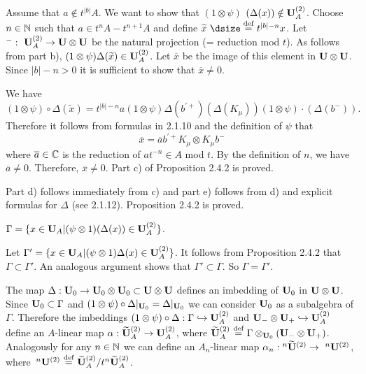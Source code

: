  Assume that  $a \notin t^{|b|}A$.  We want to show that
$(1 \otimes \psi)$ $(\Delta(x)) \notin {\bold U}_A^{(2)}$.  Choose $n \in {\Bbb
N}$  such
that $a \in t {}^nA - t {}^{n+1}A$  and  define  $\widetilde{x}\
{\dsize\buildrel{\text{def}}\over =}\ t^{|b|-n}x$.  Let
${}^-:\ {\bold U}_A^{(2)} \to {\bold U} \otimes {\bold U}$  be  the natural
projection
(= reduction mod $t$).  As follows from part b), $(1 \otimes \psi)
\Delta(\widetilde{x}) \in {\bold U}_A^{(2)}$.  Let $\overline{x}$ be the
image of this element in  ${\bold U} \otimes {\bold U}$.
Since $|b| - n > 0$  it is sufficient to show that
$\overline{x} \ne 0$.

We have
$$
(1 \otimes \psi) \circ \Delta(\widetilde{x}) = t^{|b|-n} a (1 \otimes \psi)
\Delta(b^{'+}) (\Delta(K_\mu))(1 \otimes \psi)\cdot (\Delta(b^-)).
$$
Therefore it follows from formulas in 2.1.10 and the definition of $\psi$ that
$$
\overline{x} = \overline{a} b^{'+} K_\mu \otimes K_\mu b^-
$$
where  $\overline{a} \in {\Bbb C}$  is the reduction of $at^{-n} \in A$
mod $t$.   By the definition of $n$, we have  $\overline{a} \ne 0$.
Therefore,   $\overline{x} \ne 0$.  Part c) of Proposition 2.4.2 is proved.


Part d) follows immediately from c) and part e) follows from d) and explicit
formulas for $\Delta$ (see 2.1.12). Proposition 2.4.2 is proved.


  $\Gamma =
\{ x \in {\bold U}_A|(\psi \otimes 1)(\Delta(x)) \in {\bold U}_A^{(2)}\}$.
\endproclaim

  Let  $\Gamma' = \{ x \in {\bold U}_A|(\psi \otimes 1)\Delta(x)
\in
{\bold U}_A^{(2)}\}$.  It follows from Proposition 2.4.2 that  $\Gamma \subset
\Gamma'$.
An analogous argument shows that  $\Gamma' \subset \Gamma$.  So
$\Gamma = \Gamma'$.
\enddemo

   The map $\Delta: {\bold U}_0 \to {\bold U}_0 \otimes
{\bold U}_0 \subset {\bold U} \otimes {\bold U}$  defines an imbedding of
${\bold U}_0$  in  ${\bold U} \otimes {\bold U}$.  Since  ${\bold U}_0
\subset \Gamma$ and  $(1 \otimes \psi) \circ \Delta|_{{\bold U}_0} =
\Delta|_{{\bold U}_0}$  we can consider  ${\bold U}_0$  as a subalgebra of
$\Gamma$.  Therefore the imbeddings  $(1 \otimes \psi) \circ \Delta:
\Gamma \hookrightarrow {\bold U}_A^{(2)}$  and  ${\bold U}_- \otimes
{\bold U}_+ \hookrightarrow {\bold U}_A^{(2)}$  define an $A$-linear
map $\alpha: \widetilde{\bold U}_A^{(2)} \to {\bold U}_A^{(2)}$, where
$\widetilde{\bold U}_A^{(2)}\ {\buildrel{\text{def}} \over =}\
\Gamma \otimes_{{\bold U}_0} ({\bold U}_- \otimes {\bold U}_+)$.
Analogously for any  $n \in {\Bbb N}$
we can define an $A_n$-linear map $\alpha_n: {}^n\widetilde{\bold U}^{(2)}
\to\ {}^n{\bold U}^{(2)}$, where\ ${}^n{\bold U}^{(2)}\
{\buildrel{\text{def}} \over =}\ \widetilde{\bold U}_A^{(2)}/t^n
\widetilde{\bold U}_A^{(2)}$.

